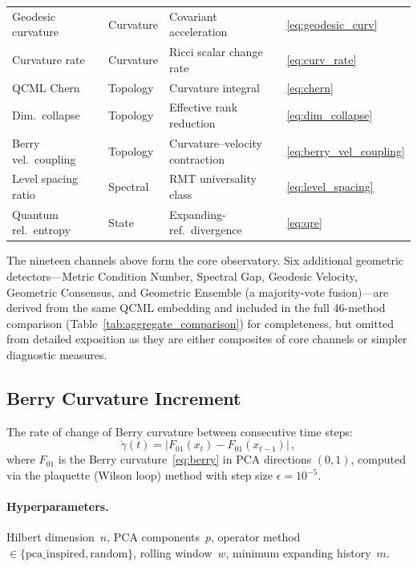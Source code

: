 \documentclass[3p]{elsarticle}
\begin{document}
\begin{table}[htb]
\begin{tabular}{llll}
Geodesic curvature & Curvature & Covariant acceleration & \eqref{eq:geodesic_curv} \\
Curvature rate & Curvature & Ricci scalar change rate & \eqref{eq:curv_rate} \\
QCML Chern & Topology & Curvature integral & \eqref{eq:chern} \\
Dim.\ collapse & Topology & Effective rank reduction & \eqref{eq:dim_collapse} \\
Berry vel.\ coupling & Topology & Curvature--velocity contraction & \eqref{eq:berry_vel_coupling} \\
Level spacing ratio & Spectral & RMT universality class & \eqref{eq:level_spacing} \\
Quantum rel.\ entropy & State & Expanding-ref.\ divergence & \eqref{eq:qre} \\
\bottomrule
\end{tabular}
\end{table}

\noindent The nineteen channels above form the core observatory.
Six additional geometric detectors---Metric Condition Number, Spectral Gap,
Geodesic Velocity, Geometric Consensus, and Geometric Ensemble (a
majority-vote fusion)---are derived from the same QCML embedding and
included in the full 46-method comparison
(Table~\ref{tab:aggregate_comparison}) for completeness, but omitted
from detailed exposition as they are either composites of core channels
or simpler diagnostic measures.

\subsection{Berry Curvature Increment}\label{subsec:berry}

The rate of change of Berry curvature between consecutive time steps:
\begin{equation}\label{eq:berry_rate}
  \dot{\gamma}(t) = |F_{01}(x_t) - F_{01}(x_{t-1})|\,,
\end{equation}
where $F_{01}$ is the Berry curvature~\eqref{eq:berry} in PCA
directions $(0,1)$, computed via the plaquette (Wilson loop) method
with step size $\epsilon = 10^{-5}$.

\paragraph{Hyperparameters.}  Hilbert dimension~$n$, PCA
components~$p$, operator method $\in
\{\text{pca\_inspired},\allowbreak \text{random}\}$, rolling
window~$w$, minimum expanding history~$m$.
\end{document}
